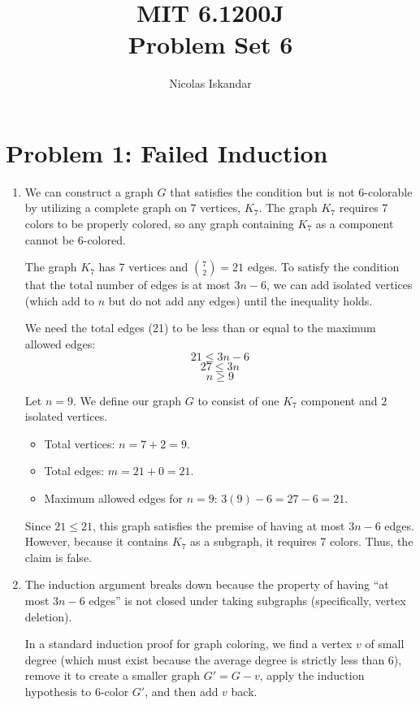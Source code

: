 \documentclass[11pt]{article}
\title{
    \vspace{-2em}
    MIT 6.1200J \\
    Problem Set 6
}
\author{Nicolas Iskandar}
\date{}
\begin{document}
\maketitle

\section*{Problem 1: Failed Induction}
\begin{enumerate}[label=\textbf{(\alph*)}]
    \item We can construct a graph $G$ that satisfies the condition but is not 6-colorable by utilizing a complete graph on 7 vertices, $K_7$. The graph $K_7$ requires 7 colors to be properly colored, so any graph containing $K_7$ as a component cannot be 6-colored.
    
    The graph $K_7$ has 7 vertices and $\binom{7}{2} = 21$ edges. To satisfy the condition that the total number of edges is at most $3n - 6$, we can add isolated vertices (which add to $n$ but do not add any edges) until the inequality holds.
    
    We need the total edges (21) to be less than or equal to the maximum allowed edges:
    $$21 \le 3n - 6$$
    $$27 \le 3n$$
    $$n \ge 9$$
    
    Let $n = 9$. We define our graph $G$ to consist of one $K_7$ component and 2 isolated vertices. 
    \begin{itemize}
        \item Total vertices: $n = 7 + 2 = 9$.
        \item Total edges: $m = 21 + 0 = 21$.
        \item Maximum allowed edges for $n=9$: $3(9) - 6 = 27 - 6 = 21$.
    \end{itemize}
    Since $21 \le 21$, this graph satisfies the premise of having at most $3n - 6$ edges. However, because it contains $K_7$ as a subgraph, it requires 7 colors. Thus, the claim is false.

    \item The induction argument breaks down because the property of having ``at most $3n - 6$ edges'' is not closed under taking subgraphs (specifically, vertex deletion). 
    
    In a standard induction proof for graph coloring, we find a vertex $v$ of small degree (which must exist because the average degree is strictly less than 6), remove it to create a smaller graph $G' = G - v$, apply the induction hypothesis to 6-color $G'$, and then add $v$ back.
    

\end{enumerate}
\end{document}
